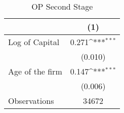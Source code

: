 \begin{table}[htbp]\centering
\def\sym#1{\ifmmode^{#1}\else\(^{#1}\)\fi}
\caption{OP Second Stage}
\begin{tabular}{l*{1}{c}}
\toprule
                    &\multicolumn{1}{c}{(1)}         \\
\midrule
Log of Capital      &       0.271\sym{***}\\
                    &     (0.010)         \\
\addlinespace
Age of the firm     &       0.147\sym{***}\\
                    &     (0.006)         \\
\midrule
Observations        &       34672         \\
\bottomrule
\end{tabular}
\end{table}
